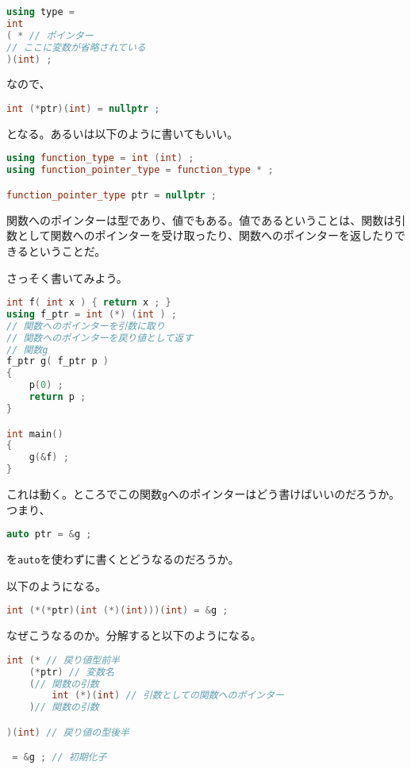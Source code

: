 \begin{lstlisting}[language={C++}]
using type =
int
( * // ポインター
// ここに変数が省略されている
)(int) ;
\end{lstlisting}

なので、
\begin{lstlisting}[language={C++}]
int (*ptr)(int) = nullptr ;
\end{lstlisting}
となる。あるいは以下のように書いてもいい。

\begin{lstlisting}[language={C++}]
using function_type = int (int) ;
using function_pointer_type = function_type * ;

function_pointer_type ptr = nullptr ;
\end{lstlisting}

関数へのポインターは型であり、値でもある。値であるということは、関数は引数として関数へのポインターを受け取ったり、関数へのポインターを返したりできるということだ。

さっそく書いてみよう。

\begin{lstlisting}[language={C++}]
int f( int x ) { return x ; }
using f_ptr = int (*) (int ) ;
// 関数へのポインターを引数に取り
// 関数へのポインターを戻り値として返す
// 関数g
f_ptr g( f_ptr p )
{
    p(0) ;
    return p ;
}

int main()
{
    g(&f) ;
}
\end{lstlisting}

これは動く。ところでこの関数\texttt{g}へのポインターはどう書けばいいのだろうか。つまり、
\begin{lstlisting}[language={C++}]
auto ptr = &g ;
\end{lstlisting}
を\texttt{auto}を使わずに書くとどうなるのだろうか。

以下のようになる。

\begin{lstlisting}[language={C++}]
int (*(*ptr)(int (*)(int)))(int) = &g ;
\end{lstlisting}

なぜこうなるのか。分解すると以下のようになる。

\begin{lstlisting}[language={C++}]
int (* // 戻り値型前半
    (*ptr) // 変数名
    (// 関数の引数
        int (*)(int) // 引数としての関数へのポインター
    )// 関数の引数

)(int) // 戻り値の型後半

 = &g ; // 初期化子
\end{lstlisting}

